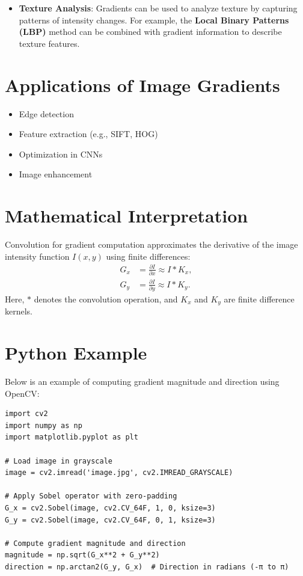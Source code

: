 \begin{notechapter}
\begin{itemize}
    \item \textbf{Texture Analysis}:
        Gradients can be used to analyze texture by capturing patterns
        of intensity changes. For example, the \textbf{Local Binary Patterns (LBP)}
        method can be combined with gradient information to describe texture features.
\end{itemize}

\section{Applications of Image Gradients}
\begin{itemize}
    \item Edge detection
    \item Feature extraction (e.g., SIFT, HOG)
    \item Optimization in CNNs
    \item Image enhancement
\end{itemize}

\section{Mathematical Interpretation}
Convolution for gradient computation approximates the
derivative of the image intensity function $I(x, y)$ using
finite differences:
\begin{align*}
    G_x &= \frac{\partial I}{\partial x} \approx I * K_x, \\
    G_y &= \frac{\partial I}{\partial y} \approx I * K_y.
\end{align*}
Here, $*$ denotes the convolution operation, and $K_x$ and $K_y$
are finite difference kernels.

\section{Python Example}
Below is an example of computing gradient magnitude and direction
using OpenCV:
\begin{verbatim}
import cv2
import numpy as np
import matplotlib.pyplot as plt

# Load image in grayscale
image = cv2.imread('image.jpg', cv2.IMREAD_GRAYSCALE)

# Apply Sobel operator with zero-padding
G_x = cv2.Sobel(image, cv2.CV_64F, 1, 0, ksize=3)
G_y = cv2.Sobel(image, cv2.CV_64F, 0, 1, ksize=3)

# Compute gradient magnitude and direction
magnitude = np.sqrt(G_x**2 + G_y**2)
direction = np.arctan2(G_y, G_x)  # Direction in radians (-π to π)


\end{verbatim}
\end{notechapter}
